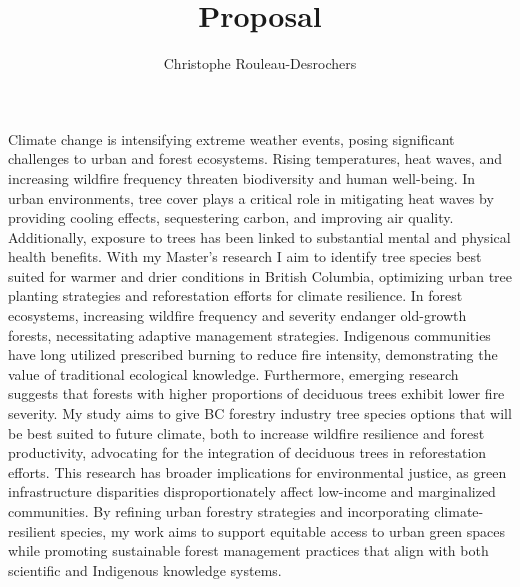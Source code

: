 \documentclass[11pt,letter]{article}
\title{Proposal}
\author{Christophe Rouleau-Desrochers}
\begin{document}

\maketitle

Climate change is intensifying extreme weather events, posing significant challenges to urban and forest ecosystems. Rising temperatures, heat waves, and increasing wildfire frequency threaten biodiversity and human well-being. In urban environments, tree cover plays a critical role in mitigating heat waves by providing cooling effects, sequestering carbon, and improving air quality. Additionally, exposure to trees has been linked to substantial mental and physical health benefits. With my Master's research I aim to identify tree species best suited for warmer and drier conditions in British Columbia, optimizing urban tree planting strategies and reforestation efforts for climate resilience.
In forest ecosystems, increasing wildfire frequency and severity endanger old-growth forests, necessitating adaptive management strategies. Indigenous communities have long utilized prescribed burning to reduce fire intensity, demonstrating the value of traditional ecological knowledge. Furthermore, emerging research suggests that forests with higher proportions of deciduous trees exhibit lower fire severity. My study aims to give BC forestry industry tree species options that will be best suited to future climate, both to increase wildfire resilience and forest productivity, advocating for the integration of deciduous trees in reforestation efforts. This research has broader implications for environmental justice, as green infrastructure disparities disproportionately affect low-income and marginalized communities. By refining urban forestry strategies and incorporating climate-resilient species, my work aims to support equitable access to urban green spaces while promoting sustainable forest management practices that align with both scientific and Indigenous knowledge systems.

\end{document}
